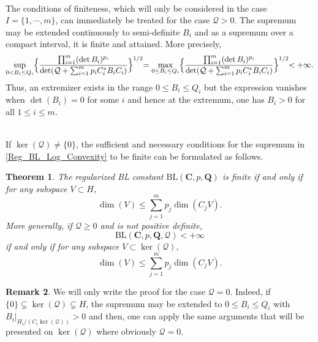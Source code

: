 \documentclass[11pt,a4paper,reqno]{amsart}
\numberwithin{equation}{section}
\newtheorem{theorem}{Theorem}[section]
\theoremstyle{definition}
\newtheorem{remark}[theorem]{Remark}
\newcommand{\<}{\ensuremath \leq}
\renewcommand{\>}{\ensuremath \geq}
\begin{document}
\hfill \\

The conditions of finiteness, which will only be considered in the case $I=\{1,\cdots,m\}$, can immediately be treated for the case $\mathcal Q>0$. The supremum may be extended continuously to semi-definite $B_i$ and as a supremum over a compact interval, it is finite and attained. More precisely, $$\sup_{0<B_i \leq Q_i}\Bigl \{ \frac{\prod_{i=1}^m (\det B_i)^{p_i}}{\det(\mathcal Q+\sum_{i=1}^m p_iC_i^* B_iC_i)}\Bigl \}^{1/2}=\max_{0 \leq B_i \leq Q_i}\Bigl \{ \frac{\prod_{i=1}^m (\det B_i)^{p_i}}{\det(\mathcal Q+\sum_{i=1}^m p_iC_i^* B_iC_i)}\Bigl \}^{1/2}<+\infty.$$ Thus, an extremizer exists in the range $0 \leq B_i \leq Q_i$ but the expression vanishes when $\det(B_i)=0$ for some $i$ and hence at the extremum, one has $B_i>0$ for all $1 \leq i \leq m.$ 


\hfill \\ 


If $\ker(\mathcal Q) \neq \{0\}$, the sufficient and necessary conditions for the supremum in \cref{Reg_BL_Log_Convexity} to be finite can be formulated as follows.








\begin{theorem} \label{Necessary_suff_cond_finite_BL}
    The regularized BL constant $\mathrm{BL}(\textbf{C},p,\textbf{Q})$ is finite if and only if for any subspace $V \subset H$, \begin{equation} \label{Condition_BL_finite}\dim(V) \leq \sum_{j=1}^m p_j \dim(C_jV).\end{equation}
    More generally, if $\mathcal Q \geq 0$ and is not positive definite, $$\mathrm{BL}(\textbf{C},p,\textbf{Q},\mathcal Q)<+\infty$$ if and only if for any subspace $V \subset \ker(\mathcal Q),$ $$\dim(V) \leq \sum_{j=1}^m p_j\dim(C_jV).$$
\end{theorem}


\begin{remark}
    We will only write the proof for the case $\mathcal Q=0.$ 
    Indeed, if $\{0\} \subsetneq \ker(\mathcal Q) \subsetneq H$, the supremum may be extended to $0 \leq B_i \leq Q_i$ with $B_i|_{H_i/(C_i\ker(\mathcal Q))}>0$ and then, one can apply the same arguments that will be presented on $\ker(\mathcal Q)$ where obviously $\mathcal Q=0.$
\end{remark}
\end{document}

